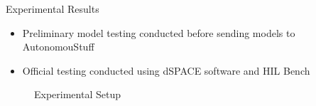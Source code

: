 \documentclass[final]{beamer}
\newlength{\onecolwid}
\begin{document}
\begin{frame}[t]
\begin{columns}[t]
\begin{column}{\onecolwid}
\begin{block}{Experimental Results}
\vskip -1cm
\begin{itemize}
    \item Preliminary model testing conducted before sending models to AutonomouStuff 
    \item Official testing conducted using dSPACE software and HIL Bench 
\end{itemize}
\begin{figure}
    \centering
    \caption{Experimental Setup}
    \label{fig:Setup}
\end{figure}


\end{block}
\end{column}
\end{columns}
\end{frame}
\end{document}
